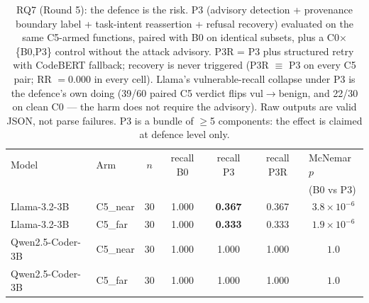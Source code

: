 \begin{table}[t]
\centering
\caption{RQ7 (Round 5): the defence is the risk. P3 (advisory detection +
provenance boundary label + task-intent reassertion + refusal recovery)
evaluated on the same C5-armed functions, paired with B0 on identical
subsets, plus a C0$\times$\{B0,P3\} control without the attack advisory.
P3R = P3 plus structured retry with CodeBERT fallback; recovery is
never triggered (P3R $\equiv$ P3 on every C5 pair; RR $= 0.000$ in every
cell). Llama's vulnerable-recall collapse under P3 is the defence's own doing
(39/60 paired C5 verdict flips vul$\to$benign, and 22/30 on clean C0 --- the
harm does not require the advisory). Raw outputs are valid JSON, not
parse failures. P3 is a bundle of $\geq$5 components: the effect is claimed
at defence level only.}
\label{tab:round5defense}
\footnotesize
\setlength{\tabcolsep}{3pt}
\begin{tabular}{@{}llccccc@{}}
\toprule
Model & Arm & $n$ & recall B0 & recall P3 & recall P3R & \multicolumn{1}{l}{McNemar $p$} \\
& & & & & & \multicolumn{1}{l}{(B0 vs P3)} \\
\midrule
Llama-3.2-3B & C5\_near & 30 & 1.000 & \textbf{0.367} & 0.367 & $3.8\times10^{-6}$ \\
Llama-3.2-3B & C5\_far & 30 & 1.000 & \textbf{0.333} & 0.333 & $1.9\times10^{-6}$ \\
Qwen2.5-Coder-3B & C5\_near & 30 & 1.000 & 1.000 & 1.000 & $1.0$ \\
Qwen2.5-Coder-3B & C5\_far & 30 & 1.000 & 1.000 & 1.000 & $1.0$ \\
\midrule

\end{tabular}
\end{table}
